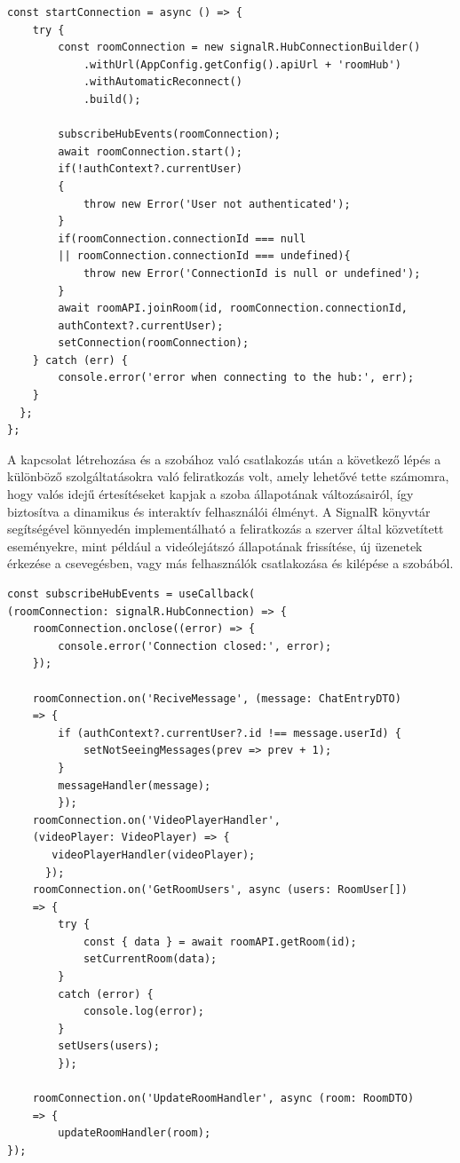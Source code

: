 \begin{lstlisting}[style=Csharp,caption={Kapcsolat létrehozása a szerverrel és csatlakozás a szobához}]
const startConnection = async () => {
    try {
        const roomConnection = new signalR.HubConnectionBuilder()
            .withUrl(AppConfig.getConfig().apiUrl + 'roomHub')
            .withAutomaticReconnect()
            .build();

        subscribeHubEvents(roomConnection);
        await roomConnection.start();
        if(!authContext?.currentUser)
        {
            throw new Error('User not authenticated');
        }
        if(roomConnection.connectionId === null 
        || roomConnection.connectionId === undefined){
            throw new Error('ConnectionId is null or undefined');
        }
        await roomAPI.joinRoom(id, roomConnection.connectionId,
        authContext?.currentUser);
        setConnection(roomConnection);
    } catch (err) {
        console.error('error when connecting to the hub:', err);
    }
  };
};
\end{lstlisting}
\vspace{1.5em}
A kapcsolat létrehozása és a szobához való csatlakozás után a következő lépés a különböző szolgáltatásokra való feliratkozás volt, amely lehetővé tette számomra, hogy valós idejű értesítéseket kapjak a szoba állapotának változásairól, így biztosítva a dinamikus és interaktív felhasználói élményt. A SignalR könyvtár segítségével könnyedén implementálható a feliratkozás a szerver által közvetített eseményekre, mint például a videólejátszó állapotának frissítése, új üzenetek érkezése a csevegésben, vagy más felhasználók csatlakozása és kilépése a szobából.
\begin{lstlisting}[style=Csharp,caption={Hub eseményekre való feliratkozások}]
const subscribeHubEvents = useCallback(
(roomConnection: signalR.HubConnection) => {
    roomConnection.onclose((error) => {
        console.error('Connection closed:', error);
    });
    
    roomConnection.on('ReciveMessage', (message: ChatEntryDTO)
    => {
        if (authContext?.currentUser?.id !== message.userId) {
            setNotSeeingMessages(prev => prev + 1);
        }
        messageHandler(message);
        });
    roomConnection.on('VideoPlayerHandler',
    (videoPlayer: VideoPlayer) => { 
       videoPlayerHandler(videoPlayer);
      });
    roomConnection.on('GetRoomUsers', async (users: RoomUser[])
    => {
        try {
            const { data } = await roomAPI.getRoom(id);
            setCurrentRoom(data);
        }
        catch (error) {
            console.log(error);
        }
        setUsers(users);
        });
    
    roomConnection.on('UpdateRoomHandler', async (room: RoomDTO)
    => {
        updateRoomHandler(room);
});
\end{lstlisting}
